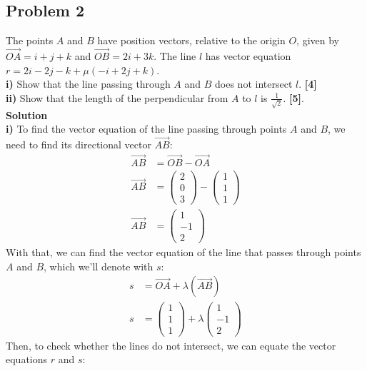 \documentclass[hidelinks, a4paper, 12pt]{article}
\newcommand{\bd}{\textbf}
\newcommand{\n}{\\[\baselineskip]}
\begin{document}
        \subsection{Problem 2}
            The points $A$ and $B$ have position vectors, relative to the origin $O$, given by $\vec{OA} = i + j + k$ and $\vec{OB} = 2i + 3k$.
            The line $l$ has vector equation $r = 2i - 2j - k + \mu(-i + 2j + k)$.\n
            \bd{i) }Show that the line passing through $A$ and $B$ does not intersect $l$. \bd{[4]}\n
            \bd{ii) }Show that the length of the perpendicular from $A$ to $l$ is $\frac{1}{\sqrt{2}}$. \bd{[5]}.\n
            \bd{Solution}\n
            \bd{i) }To find the vector equation of the line passing through points $A$ and $B$, we need to find its directional vector $\vec{AB}$:
            \[\begin{split}
                \vec{AB} &= \vec{OB} - \vec{OA} \\
                \vec{AB} &= \begin{pmatrix} 2 \\ 0 \\ 3 \end{pmatrix} - \begin{pmatrix} 1 \\ 1 \\ 1 \end{pmatrix}\\
                \vec{AB} &= \begin{pmatrix} 1 \\ -1 \\ 2 \end{pmatrix}
            \end{split}\]
            With that, we can find the vector equation of the line that passes through points $A$ and $B$, which we'll denote with $s$:
            \[\begin{split}
                s &= \vec{OA} + \lambda (\vec{AB})\\
                s &= \begin{pmatrix} 1 \\ 1 \\ 1 \end{pmatrix} + \lambda \begin{pmatrix} 1 \\ -1 \\ 2 \end{pmatrix}
            \end{split}\]
            Then, to check whether the lines do not intersect, we can equate the vector equations $r$ and $s$:
\end{document}
